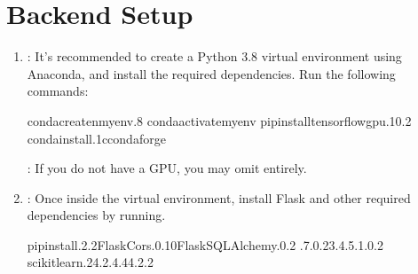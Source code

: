 \documentclass[a4paper,12pt,english]{sphinxmanual}
\begin{document}
\section{Back\sphinxhyphen{}end Setup}
\label{\detokenize{user/installation:back-end-setup}}\begin{enumerate}
%
\item {} 
\sphinxAtStartPar
{}: It’s recommended to create a Python 3.8 virtual environment using Anaconda, and install the required dependencies. Run the following commands:

\begin{sphinxVerbatim}[commandchars=\\\{\}]
condacreate\PYGZhy{}nmyenv.8
condaactivatemyenv
pipinstalltensorflow\PYGZhy{}gpu.10.2
condainstall.1\PYGZhy{}cconda\PYGZhy{}forge
\end{sphinxVerbatim}

\sphinxAtStartPar
{}: If you do not have a GPU, you may omit  entirely.

\item {} 
\sphinxAtStartPar
{}: Once inside the virtual environment, install Flask and other required dependencies by running.

\begin{sphinxVerbatim}[commandchars=\\\{\}]
pipinstall.2.2Flask\PYGZhy{}Cors.0.10Flask\PYGZhy{}SQLAlchemy.0.2
.7.0.23.4.5.1.0.2
scikit\PYGZhy{}learn.24.2.4.44.2.2
\end{sphinxVerbatim}

\end{enumerate}
\end{document}
